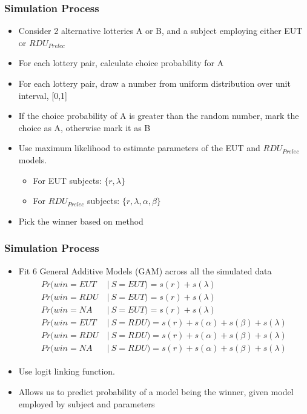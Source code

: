 \documentclass{beamer}
\newcommand\Prob{\ensuremath{\mathit{Pr}}}  %
\begin{document}
\begin{frame}
\frametitle{Simulation Process}
\begin{itemize}
	\item Consider 2 alternative lotteries A or B, and a subject employing either EUT or $\mathit{RDU_{Prelec}}$
	\item For each lottery pair, calculate choice probability for A
	\item For each lottery pair, draw a number from uniform distribution over unit interval, [0,1]
	\item If the choice probability of A is greater than the random number, mark the choice as A, otherwise mark it as B
	\item Use maximum likelihood to estimate parameters of the EUT and $\mathit{RDU_{Prelec}}$ models.
		\begin{itemize}
			\item For EUT subjects: $\lbrace r, \lambda \rbrace$
			\item For $\mathit{RDU_{Prelec}}$ subjects: $\lbrace r, \lambda, \alpha, \beta \rbrace$
		\end{itemize}
	\item Pick the winner based on \textcite{Harrison2016} method
\end{itemize}
\end{frame}

\begin{frame}
\frametitle{Simulation Process}
\begin{itemize}
	\item Fit 6 General Additive Models (GAM) \parencite{Hastie1986} across all the simulated data
	\begin{align}
		\label{eq4:GAM}
		\begin{split}
			{\Prob}(win = EUT ~&|~ S = EUT) = s(r) + s(\lambda)\\
			{\Prob}(win = RDU ~&|~ S = EUT) = s(r) + s(\lambda)\\
			{\Prob}(win = NA  ~&|~ S = EUT) = s(r) + s(\lambda)\\
			{\Prob}(win = EUT ~&|~ S = RDU) = s(r) + s(\alpha) + s(\beta) + s(\lambda)\\
			{\Prob}(win = RDU ~&|~ S = RDU) = s(r) + s(\alpha) + s(\beta) + s(\lambda)\\
			{\Prob}(win = NA  ~&|~ S = RDU) = s(r) + s(\alpha) + s(\beta) + s(\lambda)
		\end{split}
	\end{align}
	\item Use logit linking function.
	\item Allows us to predict probability of a model being the winner, given model employed by subject and parameters
\end{itemize}
\end{frame}
\end{document}
